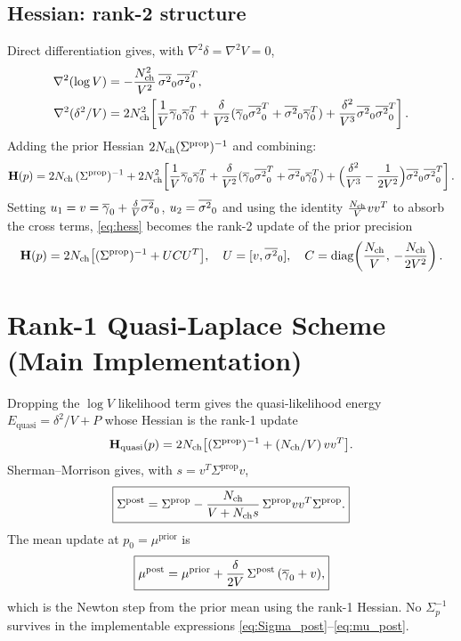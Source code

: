 \documentclass[11pt]{article}
\begin{document}
\subsection{Hessian: rank-2 structure}

Direct differentiation gives, with $\nabla^2\delta=\nabla^2 V=0$,
\begin{align}
  \nabla^2(\log V)
  &= -\frac{N_{\mathrm{ch}}^2}{V^2}\,\overline{\sigma^2}_0\overline{\sigma^2}_0^{T},\\
  \nabla^2(\delta^2/V)
  &= 2N_{\mathrm{ch}}^2\!\left[\frac{1}{V}\overline{\gamma}_0\overline{\gamma}_0^{T}
        + \frac{\delta}{V^2}(\overline{\gamma}_0\overline{\sigma^2}_0^{T}+\overline{\sigma^2}_0\overline{\gamma}_0^{T})
        + \frac{\delta^2}{V^3}\overline{\sigma^2}_0\overline{\sigma^2}_0^{T}\right].
\end{align}
Adding the prior Hessian $2N_{\mathrm{ch}}(\Sigma^{\mathrm{prop}})^{-1}$ and
combining:
\begin{equation}
  \mathbf{H}(p)
  = 2N_{\mathrm{ch}}\,(\Sigma^{\mathrm{prop}})^{-1}
  + 2N_{\mathrm{ch}}^2\!\left[\frac{1}{V}\overline{\gamma}_0\overline{\gamma}_0^{T}
       + \frac{\delta}{V^2}(\overline{\gamma}_0\overline{\sigma^2}_0^{T}+\overline{\sigma^2}_0\overline{\gamma}_0^{T})
       + \Big(\frac{\delta^2}{V^3}-\frac{1}{2V^2}\Big)\overline{\sigma^2}_0\overline{\sigma^2}_0^{T}\right].
  \label{eq:hess}
\end{equation}
Setting $u_1=v=\overline{\gamma}_0+\frac{\delta}{V}\overline{\sigma^2}_0$, $u_2=\overline{\sigma^2}_0$ and using the
identity $\frac{N_{\mathrm{ch}}}{V}vv^{T}$ to absorb the cross terms,
\eqref{eq:hess} becomes the rank-2 update of the prior precision
\begin{equation}
  \mathbf{H}(p)
  = 2N_{\mathrm{ch}}\bigl[(\Sigma^{\mathrm{prop}})^{-1} + UCU^{T}\bigr],
  \quad
  U=[v,\overline{\sigma^2}_0],
  \quad
  C=\operatorname{diag}\!\left(\frac{N_{\mathrm{ch}}}{V},\,-\frac{N_{\mathrm{ch}}}{2V^2}\right).
  \label{eq:rank2}
\end{equation}

\section{Rank-1 Quasi-Laplace Scheme (Main Implementation)}

Dropping the $\log V$ likelihood term gives the quasi-likelihood energy
$E_{\mathrm{quasi}}=\delta^2/V+P$ whose Hessian is the rank-1 update
\begin{equation}
  \mathbf{H}_{\mathrm{quasi}}(p)
  = 2N_{\mathrm{ch}}\bigl[(\Sigma^{\mathrm{prop}})^{-1} + (N_{\mathrm{ch}}/V)\,vv^{T}\bigr].
  \label{eq:rank1}
\end{equation}
Sherman--Morrison gives, with $s=v^{T}\Sigma^{\mathrm{prop}}v$,
\begin{equation}
  \boxed{
    \Sigma^{\mathrm{post}}
    = \Sigma^{\mathrm{prop}}
    - \frac{N_{\mathrm{ch}}}{V+N_{\mathrm{ch}} s}\,
      \Sigma^{\mathrm{prop}}vv^{T}\Sigma^{\mathrm{prop}}.
  }
  \label{eq:Sigma_post}
\end{equation}
The mean update at $p_0=\mu^{\mathrm{prior}}$ is
\begin{equation}
  \boxed{
    \mu^{\mathrm{post}}
    = \mu^{\mathrm{prior}}
    + \frac{\delta}{2V}\,\Sigma^{\mathrm{post}}\,(\overline{\gamma}_0+v),
  }
  \label{eq:mu_post}
\end{equation}
which is the Newton step from the prior mean using the rank-1
Hessian. No $\Sigma_p^{-1}$ survives in the implementable expressions
\eqref{eq:Sigma_post}--\eqref{eq:mu_post}.
\end{document}
